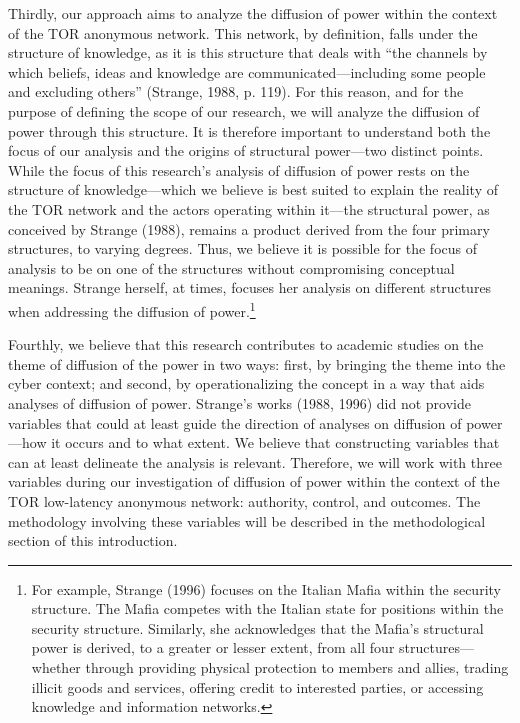 Thirdly, our approach aims to analyze the diffusion of power within the context of the TOR anonymous network. This network, by definition, falls under the structure of knowledge, as it is this structure that deals with “the channels by which beliefs, ideas and knowledge are communicated—including some people and excluding others” (Strange, 1988, p. 119).
For this reason, and for the purpose of defining the scope of our research, we will analyze the diffusion of power through this structure. It is therefore important to understand both the focus of our analysis and the origins of structural power—two distinct points.
While the focus of this research's analysis of diffusion of power rests on the structure of knowledge—which we believe is best suited to explain the reality of the TOR network and the actors operating within it—the structural power, as conceived by Strange (1988), remains a product derived from the four primary structures, to varying degrees. Thus, we believe it is possible for the focus of analysis to be on one of the structures without compromising conceptual meanings. Strange herself, at times, focuses her analysis on different structures when addressing the diffusion of power.\footnote{For example, Strange (1996) focuses on the Italian Mafia within the security structure. The Mafia competes with the Italian state for positions within the security structure. Similarly, she acknowledges that the Mafia's structural power is derived, to a greater or lesser extent, from all four structures—whether through providing physical protection to members and allies, trading illicit goods and services, offering credit to interested parties, or accessing knowledge and information networks.}

Fourthly, we believe that this research contributes to academic studies on the theme of diffusion of the power in two ways: first, by bringing the theme into the cyber context; and second, by operationalizing the concept in a way that aids analyses of diffusion of power. Strange's works (1988, 1996) did not provide variables that could at least guide the direction of analyses on diffusion of power—how it occurs and to what extent. We believe that constructing variables that can at least delineate the analysis is relevant. Therefore, we will work with three variables during our investigation of diffusion of power within the context of the TOR low-latency anonymous network: authority, control, and outcomes. The methodology involving these variables will be described in the methodological section of this introduction.

